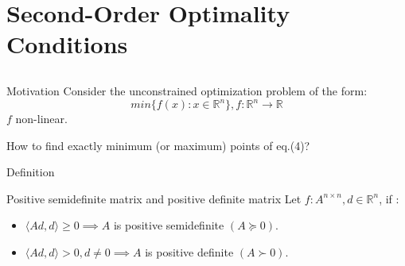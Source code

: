 \section{Second-Order Optimality Conditions}
\subsection{}
    \begin{frame}{Motivation}
    Consider the unconstrained optimization problem of the form:
        \begin{equation}
            min\{ f(x): x \in \mathbb{R}^n\}, f: \mathbb{R}^n \longrightarrow \mathbb{R}
        \end{equation}
        $f$ non-linear.
        \begin{parchment}[Problem]
            How to find exactly minimum (or maximum) points of eq.(4)?
        \end{parchment}
    
    \end{frame}

    \begin{frame}{Definition}
        \begin{block}{Positive semidefinite matrix and positive definite matrix}
        Let $f : A^{n \times n}, d \in \mathbb{R}^n$, if :
        \begin{itemize}
            \item $\langle Ad,d \rangle \geq 0 \implies A$ is positive semidefinite $(A \succeq 0)$.
            \item $\langle Ad,d \rangle > 0, d \neq 0 \implies A$ is positive definite $(A \succ 0)$.
        \end{itemize}
        \end{block}
    \end{frame}


